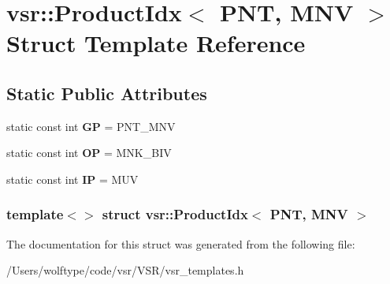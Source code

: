 \hypertarget{structvsr_1_1_product_idx_3_01_p_n_t_00_01_m_n_v_01_4}{\section{vsr\-:\-:Product\-Idx$<$ P\-N\-T, M\-N\-V $>$ Struct Template Reference}
\label{structvsr_1_1_product_idx_3_01_p_n_t_00_01_m_n_v_01_4}
}
\subsection*{Static Public Attributes}
\begin{DoxyCompactItemize}
\item 
\hypertarget{structvsr_1_1_product_idx_3_01_p_n_t_00_01_m_n_v_01_4_a202983babb99b0bc7b94dda86ad0fca8}{static const int {\bfseries G\-P} = P\-N\-T\-\_\-\-M\-N\-V}\label{structvsr_1_1_product_idx_3_01_p_n_t_00_01_m_n_v_01_4_a202983babb99b0bc7b94dda86ad0fca8}

\item 
\hypertarget{structvsr_1_1_product_idx_3_01_p_n_t_00_01_m_n_v_01_4_a06684c9c459040e08c2075ca54b58be7}{static const int {\bfseries O\-P} = M\-N\-K\-\_\-\-B\-I\-V}\label{structvsr_1_1_product_idx_3_01_p_n_t_00_01_m_n_v_01_4_a06684c9c459040e08c2075ca54b58be7}

\item 
\hypertarget{structvsr_1_1_product_idx_3_01_p_n_t_00_01_m_n_v_01_4_a2db42f85eabe86bd05b74764ee211b5f}{static const int {\bfseries I\-P} = M\-U\-V}\label{structvsr_1_1_product_idx_3_01_p_n_t_00_01_m_n_v_01_4_a2db42f85eabe86bd05b74764ee211b5f}

\end{DoxyCompactItemize}
\subsubsection*{template$<$$>$ struct vsr\-::\-Product\-Idx$<$ P\-N\-T, M\-N\-V $>$}



The documentation for this struct was generated from the following file\-:\begin{DoxyCompactItemize}
\item 
/\-Users/wolftype/code/vsr/\-V\-S\-R/vsr\-\_\-templates.\-h\end{DoxyCompactItemize}
